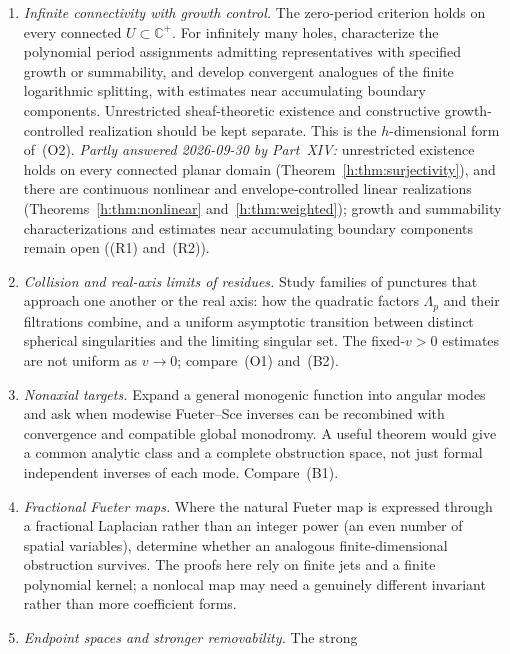 \documentclass[11pt,a4paper]{article}
\numberwithin{equation}{section}
\theoremstyle{definition}
\theoremstyle{remark}
\theoremstyle{plain}
\newcommand{\CC}{\mathbb C}
\newcommand{\Cplus}{\CC^{+}}
\newcommand{\Rq}{\Lambda}                         %
\begin{document}
\begin{enumerate}[label=\textup{(Q\arabic*)}]
inverse is continuous and linear with compact-set estimates, also across the
real axis (Theorem~\ref{h:thm:stable-inverse}), and there is no continuous
linear removal of infinitely many periods
(Corollary~\ref{h:cor:no-removal}); the Sobolev and H\"older estimates asked
for here remain open ((R4) of \S\ref{h:sec:future}).
\item \emph{Infinite connectivity with growth control.} The zero-period
criterion holds on every connected $U\subset\Cplus$. For infinitely many holes,
characterize the polynomial period assignments admitting representatives with
specified growth or summability, and develop convergent analogues of the
finite logarithmic splitting, with estimates near accumulating boundary
components. Unrestricted sheaf-theoretic existence and constructive
growth-controlled realization should be kept separate. This is the
$h$-dimensional form of~(O2). \emph{Partly answered 2026-09-30 by Part~XIV:}
unrestricted existence holds on every connected planar domain
(Theorem~\ref{h:thm:surjectivity}), and there are continuous nonlinear and
envelope-controlled linear realizations (Theorems~\ref{h:thm:nonlinear}
and~\ref{h:thm:weighted}); growth and summability characterizations and
estimates near accumulating boundary components remain open ((R1)
and~(R2)).
\item \emph{Collision and real-axis limits of residues.} Study families of
punctures that approach one another or the real axis: how the quadratic
factors $\Rq_p$ and their filtrations combine, and a uniform asymptotic
transition between distinct spherical singularities and the limiting singular
set. The fixed-$v>0$ estimates are not uniform as $v\to0$; compare~(O1)
and~(B2).
\item \emph{Nonaxial targets.} Expand a general monogenic function into
angular modes and ask when modewise Fueter--Sce inverses can be recombined
with convergence and compatible global monodromy. A useful theorem would give
a common analytic class and a complete obstruction space, not just formal
independent inverses of each mode. Compare~(B1).
\item \emph{Fractional Fueter maps.} Where the natural Fueter map is
expressed through a fractional Laplacian rather than an integer power (an
even number of spatial variables), determine whether an analogous
finite-dimensional obstruction survives. The proofs here rely on finite jets
and a finite polynomial kernel; a nonlocal map may need a genuinely different
invariant rather than more coefficient forms.
\item \emph{Endpoint spaces and stronger removability.} The strong

\end{enumerate}
\end{document}

